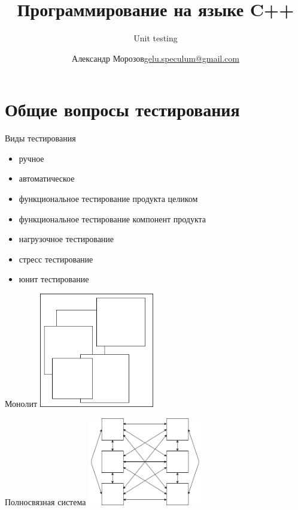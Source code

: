 \documentclass[unknownkeysallowed,xcolor=table]{beamer}
\title[C++]
{Программирование на языке C++}
\subtitle{Unit testing}
\author[А.~Б.~Морозов]
{
  \texorpdfstring{Александр Морозов\newline\href{mailto:gelu.speculum@gmail.com}{gelu.speculum@gmail.com}}
  {Александр Морозов}
}
\begin{document}
\section{Общие вопросы тестирования}

\begin{frame}{Виды тестирования}
  \begin{itemize}
    \item ручное \vspace{0.5em}
    \item автоматическое
  \end{itemize}
  \vspace{2em}
  \begin{itemize}
    \item функциональное тестирование продукта целиком \vspace{0.5em}
    \item функциональное тестирование компонент продукта \vspace{0.5em}
    \item нагрузочное тестирование \vspace{0.5em}
    \item стресс тестирование \vspace{0.5em}
    \item юнит тестирование
  \end{itemize}
\end{frame}

\begin{frame}{Монолит}
  \includegraphics[align=c,width=5cm,keepaspectratio]{images/unit_testing/monolith.png}
\end{frame}

\begin{frame}{Полносвязная система}
  \includegraphics[align=c,width=5cm,keepaspectratio]{images/unit_testing/interconnected.png}
\end{frame}
\end{document}
